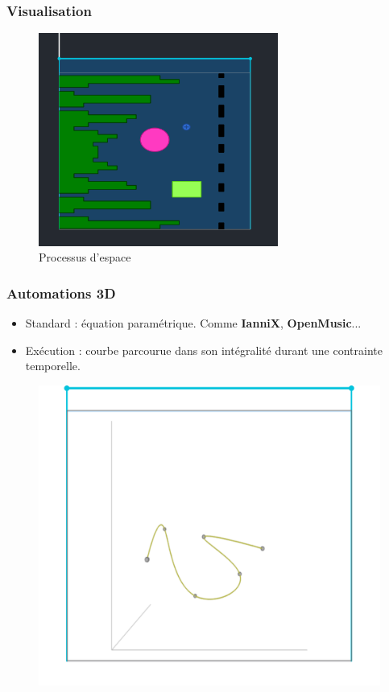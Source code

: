 \documentclass{beamer}
\begin{document}
\begin{frame}
    \frametitle{Visualisation}
    \Large
    \begin{figure}
        \includegraphics[width=0.7\textwidth]{images/espace.png}
        \caption{Processus d'espace}
    \end{figure}
\end{frame}
\begin{frame}
    \frametitle{Automations 3D}\Large
    \begin{itemize}
        \item Standard : équation paramétrique. Comme \textbf{IanniX}, \textbf{OpenMusic}...
        \item Exécution : courbe parcourue dans son intégralité durant une contrainte temporelle.
    \end{itemize}
    \begin{figure}
        \centering
        \includegraphics[scale=0.5]{images/autom3d.png}
    \end{figure}
\end{frame}
\end{document}

